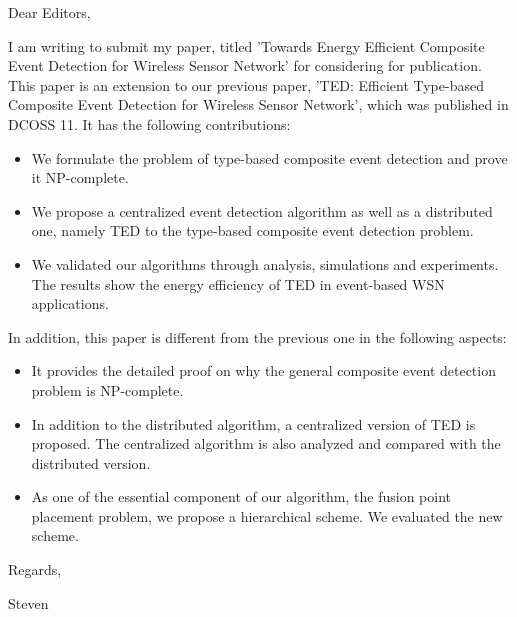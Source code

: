 Dear Editors,

I am writing to submit my paper, titled 'Towards Energy Efficient Composite Event Detection for Wireless Sensor Network' for considering for publication. This paper is an extension to our previous paper, 'TED: Efficient Type-based Composite Event Detection for Wireless Sensor Network', which was published in DCOSS 11. It has the following contributions:
\begin{itemize}
  \item We formulate the problem of type-based composite event detection and prove it NP-complete.
  \item We propose a centralized event detection algorithm as well as a distributed one, namely TED to the type-based composite event detection problem.
  \item We validated our algorithms through analysis, simulations and experiments. The results show the energy efficiency of TED in event-based WSN applications.
\end{itemize}

In addition, this paper is different from the previous one in the following aspects:
\begin{itemize}
\item It provides the detailed proof on why the general composite event detection problem is NP-complete.
\item In addition to the distributed algorithm, a centralized version of TED is proposed. The centralized algorithm is also analyzed and compared with the distributed version.
\item As one of the essential component of our algorithm, the fusion point placement problem, we propose a hierarchical scheme. We evaluated the new scheme.
\end{itemize}

Regards,

Steven
